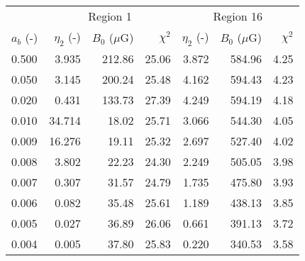 \begin{tabular}{@{}lrrrrrr@{}}
\toprule
{} & \multicolumn{3}{c}{Region 1} & \multicolumn{3}{c}{Region 16}\\
\cmidrule(lr){2-4} \cmidrule(l){5-7}
$a_b$ (-) & $\eta_2$ (-) & $B_0$ ($\mu$G) & $\chi^2$
          & $\eta_2$ (-) & $B_0$ ($\mu$G) & $\chi^2$ \\
\midrule
0.500 &  3.935 & 212.86 & 25.06 & 3.872 & 584.96 & 4.25 \\
0.050 &  3.145 & 200.24 & 25.48 & 4.162 & 594.43 & 4.23 \\
0.020 &  0.431 & 133.73 & 27.39 & 4.249 & 594.19 & 4.18 \\
0.010 & 34.714 &  18.02 & 25.71 & 3.066 & 544.30 & 4.05 \\
0.009 & 16.276 &  19.11 & 25.32 & 2.697 & 527.40 & 4.02 \\
0.008 &  3.802 &  22.23 & 24.30 & 2.249 & 505.05 & 3.98 \\
0.007 &  0.307 &  31.57 & 24.79 & 1.735 & 475.80 & 3.93 \\
0.006 &  0.082 &  35.48 & 25.61 & 1.189 & 438.13 & 3.85 \\
0.005 &  0.027 &  36.89 & 26.06 & 0.661 & 391.13 & 3.72 \\
0.004 &  0.005 &  37.80 & 25.83 & 0.220 & 340.53 & 3.58 \\
\bottomrule
\end{tabular}
